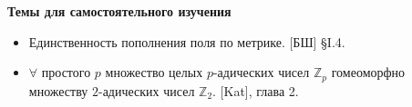 \documentclass[a4paper, 11pt]{article}
\begin{document}

\noindent\textbf{Темы для самостоятельного изучения}
\begin{itemize}[topsep=0pt]
    \item Единственность пополнения поля по метрике. [БШ] \S I.4.
    \item $\forall$ простого $p$ множество целых $p$-адических чисел $\mathbb{Z}_p$ гомеоморфно множеству $2$-адических чисел $\mathbb{Z}_2$. [Kat], глава 2. %
\end{itemize}
\end{document}
